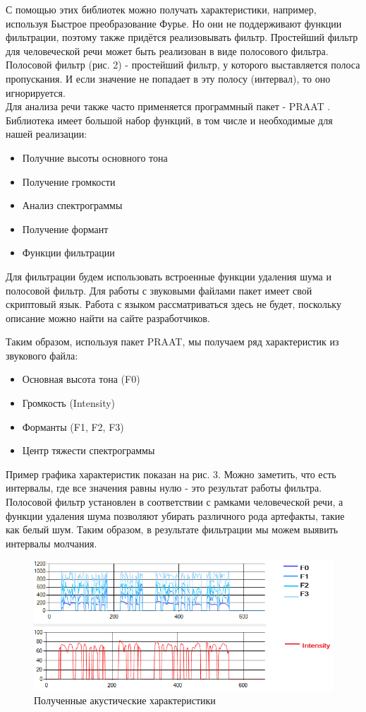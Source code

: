 \documentclass[14pt]{extarticle}
\begin{document}
С помощью этих библиотек можно получать характеристики, например, используя Быстрое преобразование Фурье. Но они не поддерживают функции фильтрации, поэтому также придётся реализовывать фильтр. Простейший фильтр для человеческой речи может быть реализован в виде полосового фильтра.
Полосовой фильтр (рис. 2) - простейший фильтр, у которого выставляется полоса пропускания. И если значение не попадает в эту полосу (интервал), то оно игнорируется. 
\\
Для анализа речи также часто применяется программный пакет - PRAAT \cite{praat}. Библиотека имеет большой набор функций, в том числе и необходимые для нашей реализации:
\begin{itemize}
	\item Получние высоты основного тона
	\item Получение громкости
	\item Анализ спектрограммы
	\item Получение формант
	\item Функции фильтрации
\end{itemize}
Для фильтрации будем использовать встроенные функции удаления шума и полосовой фильтр.
Для работы с звуковыми файлами пакет имеет свой скриптовый язык. Работа с языком рассматриваться здесь не будет, поскольку описание можно найти на сайте разработчиков. 



Таким образом, используя пакет PRAAT, мы получаем ряд характеристик из звукового файла:
\begin{itemize}
	\item Основная высота тона (F0)
	\item Громкость (Intensity)
	\item Форманты (F1, F2, F3)
	\item Центр тяжести спектрограммы
\end{itemize}
Пример графика характеристик показан на рис. 3. Можно заметить, что есть интервалы, где все значения равны нулю - это результат работы фильтра. Полосовой фильтр установлен в соответствии с рамками человеческой речи, а функции удаления шума позволяют убирать различного рода артефакты, такие как белый шум. Таким образом, в результате фильтрации мы можем выявить интервалы молчания.
\begin{figure}
	\centering
		\includegraphics[scale=0.8]{images/sound-characteristics.png}
	\caption{Полученные акустические характеристики}
	\label{fig:sound-characteristics}
\end{figure}
\end{document}
